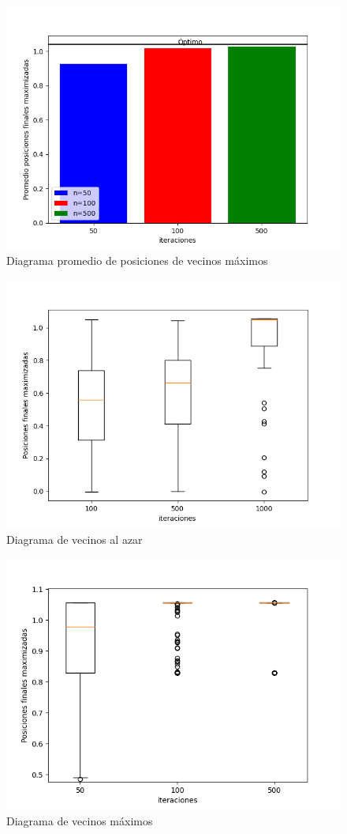 \documentclass{article}
\begin{document}
\begin{figure}
    \centering
    \includegraphics[width=200mm]{R1_prom_vec_max.png}
    \caption{Diagrama promedio de posiciones de vecinos máximos}
    \label{figure}
\end{figure}

\begin{figure}
    \centering
    \includegraphics[width=200mm]{R1_vecinos_azar.png}
    \caption{Diagrama de vecinos al azar}
    \label{figure}
\end{figure}

\begin{figure}
    \centering
    \includegraphics[width=200mm]{R1_vecinos_max.png}
    \caption{Diagrama de vecinos máximos}
    \label{figure}
\end{figure}



\end{document}
